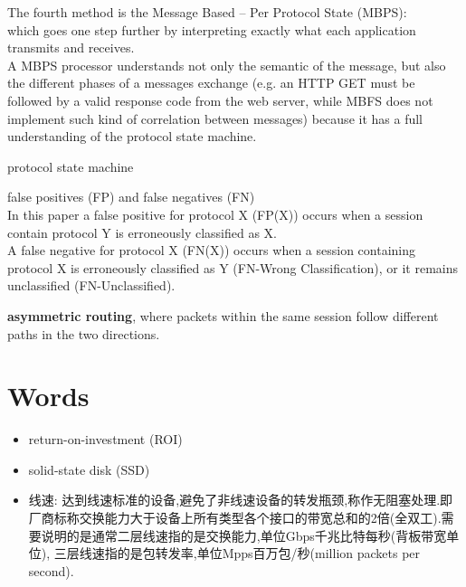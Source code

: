 \documentclass{article}
\begin{document}
The fourth method is the Message Based – Per Protocol State (MBPS):\\
which goes one step further by interpreting exactly what each application transmits and receives. \\
A MBPS processor understands not only the semantic of the message, but also the different phases of a messages exchange 
(e.g. an HTTP GET must be followed by a valid response code from the web server, while MBFS does not implement such kind of correlation between messages) 
because it has a full understanding of the protocol state machine. 

\bigskip
protocol state machine

\bigskip
false positives (FP) and false negatives (FN)\\
In this paper a false positive for protocol X (FP(X)) occurs when a session contain protocol Y is erroneously classified as X. \\
A false negative for protocol X (FN(X)) occurs when a session containing protocol X is erroneously classified as Y (FN-Wrong Classification), or it remains unclassified (FN-Unclassified).

\textbf{asymmetric routing}, where packets within the same session follow different paths in the two directions.

\section{Words}\label{words}
\begin{itemize}
\item return-on-investment (ROI)
\item solid-state disk (SSD)
\item 线速:
  达到线速标准的设备,避免了非线速设备的转发瓶颈,称作无阻塞处理.即厂商标称交换能力大于设备上所有类型各个接口的带宽总和的2倍(全双工).需要说明的是通常二层线速指的是交换能力,单位Gbps千兆比特每秒(背板带宽单位), 三层线速指的是包转发率,单位Mpps百万包/秒(million packets per second).
\end{itemize}
\end{document}
